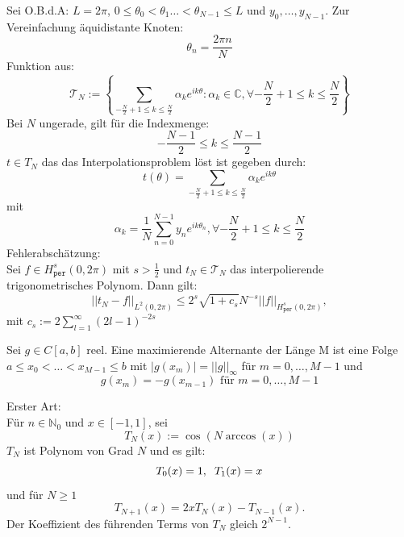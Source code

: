 \documentclass{report}
\begin{document}
 {
  Sei O.B.d.A: $L= 2\pi$, $0 \leq \theta_0 < \theta_1 \dots 
    < \theta_{N-1} \leq L
  $
  und $y_0, \dots, y_{N-1}$.
  Zur Vereinfachung äquidistante Knoten:
  \[
    \theta_n = \frac{2\pi n}{N}
  \]
  Funktion aus: 
  \[
    \mathcal{T}_N := 
    \left\{\sum_{-\frac{N}{2} +1 \leq k \leq \frac{N}{2}}
      \alpha_ke^{ik\theta} : \alpha_k \in \mathbb{C},
      \forall -\frac{N}{2}+1\leq k \leq \frac{N}{2}
    \right\}
  \]
  Bei $N$ ungerade, gilt für die Indexmenge:
  \[
    -\frac{N-1}{2} \leq k \leq \frac{N-1}{2}
  \]
  $t \in T_N$ das das Interpolationsproblem löst 
  ist gegeben durch:
  \[
    t(\theta) = \sum_{-\frac{N}{2} +1 \leq k \leq \frac{N}{2}}
      \alpha_ke^{ik\theta}
  \]
  mit
  \[
    \alpha_k = \frac{1}{N}\sum_{n=0}^{N-1}y_ne^{ik\theta_n}, 
    \forall-\frac{N}{2} +1 \leq k \leq \frac{N}{2}
  \]
  Fehlerabschätzung:\\
  Sei $f \in H^s_\texttt{per}(0,2\pi)$ mit $s > \frac{1}{2}$
  und $t_N \in \mathcal{T}_N$ das interpolierende trigonometrisches
  Polynom. Dann gilt: 
  \[
    ||t_N-f||_{L^2(0,2\pi)} \leq 2^s 
    \sqrt{1 + c_s } N^{-s}||f||_{H^s_\texttt{per}(0,2\pi)},
  \]
  mit $c_s := 2 \sum^{\infty}_{l=1} (2l-1)^{-2s}$
}

 {
  Sei $g \in C[a,b]$ reel. Eine maximierende 
  Alternante der Länge M ist eine Folge 
  $a \leq x_0 < \dots < x_{M-1} \leq b$ 
  mit $|g(x_m)| = ||g||_\infty$ für $m = 0,\dots,M-1$
  und 
  \[
    g(x_m) = -g(x_{m-1}) \text{ für } m= 0,\dots,M-1
  \]
}

 {
  Erster Art:\\
  Für $n \in \mathbb{N}_0$ und 
  $x \in [-1,1]$, sei
  \[
    T_N(x) := \cos(N \arccos(x))
  \]
  $T_N$ ist Polynom von Grad $N$ und es gilt:
  \[
    T_0(x) = 1, \hspace{0.2cm} T_1(x) = x
  \]
  und für $N \geq 1$
  \[
    T_{N+1}(x) = 2xT_N(x) - T_{N-1}(x).
  \]
  Der Koeffizient des führenden Terms von $T_N$ 
  gleich $2^{N-1}$.
}
\end{document}
